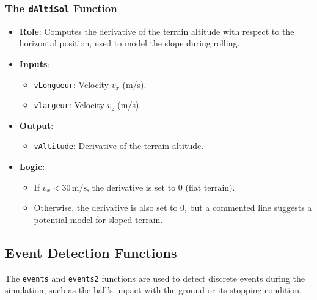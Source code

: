 \documentclass[10pt,a4paper]{report}
\begin{document}
\subsubsection{The \texttt{dAltiSol} Function}
\begin{itemize}
    \item \textbf{Role}: Computes the derivative of the terrain altitude with respect to the horizontal position, used to model the slope during rolling.
    \item \textbf{Inputs}:
    \begin{itemize}
        \item \texttt{vLongueur}: Velocity \(v_x\) (m/s).
        \item \texttt{vlargeur}: Velocity \(v_z\) (m/s).
    \end{itemize}
    \item \textbf{Output}:
    \begin{itemize}
        \item \texttt{vAltitude}: Derivative of the terrain altitude.
    \end{itemize}
    \item \textbf{Logic}:
    \begin{itemize}
        \item If \(v_x < 30 \, \text{m/s}\), the derivative is set to \(0\) (flat terrain).
        \item Otherwise, the derivative is also set to \(0\), but a commented line suggests a potential model for sloped terrain.
    \end{itemize}
\end{itemize}

\bigskip
\subsection{Event Detection Functions}
\label{subsec:event_functions}

The \texttt{events} and \texttt{events2} functions are used to detect discrete events during the simulation, such as the ball's impact with the ground or its stopping condition.
\end{document}

